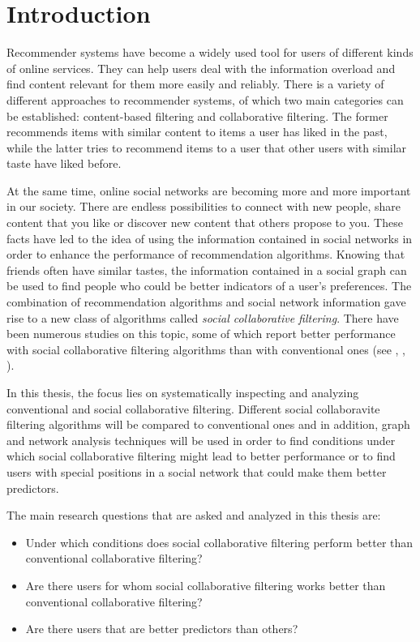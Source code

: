 \chapter{Introduction}
\label{c:introduction} Recommender systems have become a widely used tool for users of different kinds of online services. They can help users deal with the information overload and find content relevant for them more easily and reliably. There is a variety of different approaches to recommender systems, of which two main categories can be established: content-based filtering and collaborative filtering. The former recommends items with similar content to items a user has liked in the past, while the latter tries to recommend items to a user that other users with similar taste have liked before.

At the same time, online social networks are becoming more and more important in our society. There are endless possibilities to connect with new people, share content that you like or discover new content that others propose to you. These facts have led to the idea of using the information contained in social networks in order to enhance the performance of recommendation algorithms. Knowing that friends often have similar tastes, the information contained in a social graph can be used to find people who could be better indicators of a user's preferences. The combination of recommendation algorithms and social network information gave rise to a new class of algorithms called \textit{social collaborative filtering}. There have been numerous studies on this topic, some of which report better performance with social collaborative filtering algorithms than with conventional ones (see \cite{Zheng_2008}, \cite{Konstas_2009}, \cite{Liu_2010}).

In this thesis, the focus lies on systematically inspecting and analyzing conventional and social collaborative filtering. Different social collaboravite filtering algorithms will be compared to conventional ones and in addition, graph and network analysis techniques will be used in order to find conditions under which social collaborative filtering might lead to better performance or to find users with special positions in a social network that could make them better predictors.

The main research questions that are asked and analyzed in this thesis are:
\begin{itemize}
\item Under which conditions does social collaborative filtering perform better than conventional collaborative filtering?
\item Are there users for whom social collaborative filtering works better than conventional collaborative filtering?
\item Are there users that are better predictors than others?
\end{itemize}

